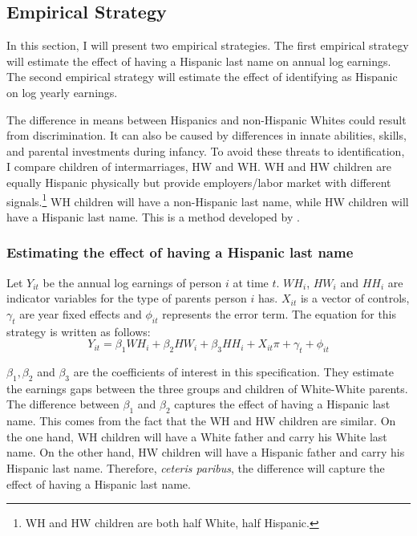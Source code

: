 \documentclass[12pt, fullpage]{article}
\begin{document}
\subsection{Empirical Strategy}\label{sec:emp_model}
In this section, I will present two empirical strategies. The first empirical strategy will estimate the effect of having a Hispanic last name on annual log earnings. The second empirical strategy will estimate the effect of identifying as Hispanic on log yearly earnings.

The difference in means between Hispanics and non-Hispanic Whites could result from discrimination. It can also be caused by differences in innate abilities, skills, and parental investments during infancy. To avoid these threats to identification, I compare children of intermarriages, HW and WH. WH and HW children are equally Hispanic physically but provide employers/labor market with different signals.\footnote{WH and HW children are both half White, half Hispanic.} WH children will have a non-Hispanic last name, while HW children will have a Hispanic last name. This is a method developed by \citet{rubinstein2014pride}.

\subsubsection{Estimating the effect of having a Hispanic last name}

Let $Y_{it}$ be the annual log earnings of person $i$ at time $t$. $WH_{i}$, $HW_{i}$ and $HH_{i}$ are indicator variables for the type of parents person $i$ has. $X_{it}$ is a vector of controls, $\gamma_{t}$ are year fixed effects and $\phi_{it}$ represents the error term. The equation for this strategy is written as follows:
\begin{equation} \label{eq:1a}
Y_{it} = \beta_{1} WH_{i} +\beta_{2} HW_{i} + \beta_{3} HH_{i} + X_{it} \pi + \gamma_{t}+\phi_{it}
\end{equation}

$\beta_{1}, \beta_{2}$ and $\beta_{3}$ are the coefficients of interest in this specification. They estimate the earnings gaps between the three groups and children of White-White parents. The difference between $\beta_{1}$ and $\beta_{2}$ captures the effect of having a Hispanic last name. This comes from the fact that the WH and HW children are similar. On the one hand, WH children will have a White father and carry his White last name. On the other hand, HW children will have a Hispanic father and carry his Hispanic last name. Therefore, \textit{ceteris paribus}, the difference will capture the effect of having a Hispanic last name.
\end{document}
